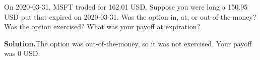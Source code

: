 \noindent On 2020-03-31, MSFT traded for 162.01 USD. Suppose you were long a 150.95 USD put that expired on 2020-03-31. Was the option in, at, or out-of-the-money? Was the option exercised? What was your payoff at expiration?

\vspace{9pt} 

\textbf{Solution.}The option was out-of-the-money, so it was not exercised. Your payoff was 0 USD.